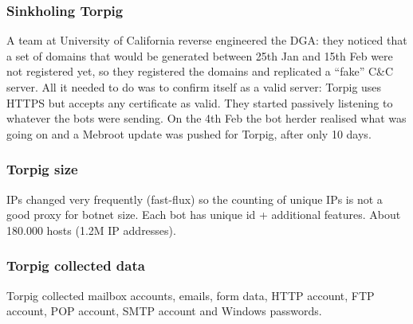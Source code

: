 \documentclass[a4paper, 10pt, titlepage]{article}
\begin{document}
\subsubsection*{Sinkholing Torpig}
A team at University of California reverse engineered the DGA: they noticed that a set of domains that would be generated between 25th Jan and 15th Feb were not registered yet, so they registered the domains and replicated a “fake” C\&C server. All it needed to do was to confirm itself as a valid server: Torpig uses HTTPS but accepts any certificate as valid. They started passively listening to whatever the bots were sending. On the 4th Feb the bot herder realised what was going on and a Mebroot update was pushed for Torpig, after only 10 days.

\subsubsection*{Torpig size}
IPs changed very frequently (fast-flux) so the counting of unique IPs is not a good proxy for botnet size. Each bot has unique id +  additional features. About 180.000 hosts (1.2M IP addresses).

\subsubsection*{Torpig collected data}
Torpig collected mailbox accounts, emails, form data, HTTP account, FTP account, POP account, SMTP account and Windows passwords.
\end{document}
